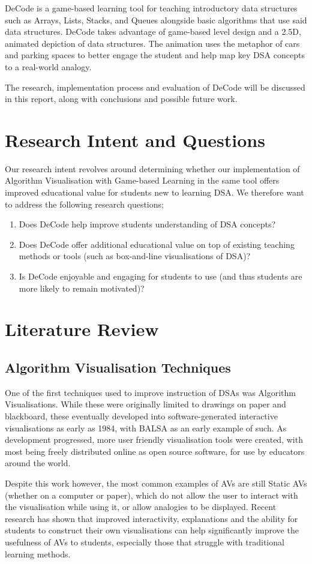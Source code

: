 \documentclass[10pt]{article}
\begin{document}
DeCode is a game-based learning tool for teaching introductory data structures such as Arrays, Lists, Stacks, and Queues alongside basic algorithms that use said data structures. DeCode takes advantage of game-based level design and a 2.5D, animated depiction of data structures. The animation uses the metaphor of cars and parking spaces to better engage the student and help map key DSA concepts to a real-world analogy.\par
The research, implementation process and evaluation of DeCode will be discussed in this report, along with conclusions and possible future work.
\section{Research Intent and Questions}
Our research intent revolves around determining whether our implementation of Algorithm Visualisation with Game-based Learning in the same tool offers improved educational value for students new to learning DSA. We therefore want to address the following research questions;
\begin{enumerate}
  \item Does DeCode help improve students understanding of DSA concepts?
  \item Does DeCode offer additional educational value on top of existing teaching methods or tools (such as box-and-line visualisations of DSA)?
  \item Is DeCode enjoyable and engaging for students to use (and thus students are more likely to remain motivated)?
\end{enumerate}
\section{Literature Review}
\subsection{Algorithm Visualisation Techniques}
One of the first techniques used to improve instruction of DSAs was Algorithm Visualisations. While these were originally limited to drawings on paper and blackboard, these eventually developed into software-generated interactive visualisations as early as 1984, with BALSA\cite{Brown:1984:SAA:964965.808596} as an early example of such. As development progressed, more user friendly visualisation tools were created, with most being freely distributed online as open source software, for use by educators around the world.\par
Despite this work however, the most common examples of AVs are still Static AVs (whether on a computer or paper), which do not allow the user to interact with the visualisation while using it, or allow analogies to be displayed. Recent research has shown that improved interactivity, explanations\cite{vegh2} and the ability for students to construct their own visualisations can help significantly improve the usefulness of AVs to students, especially those that struggle with traditional learning methods\cite{Stasko:1993:AAA:169059.169078}.
\end{document}
